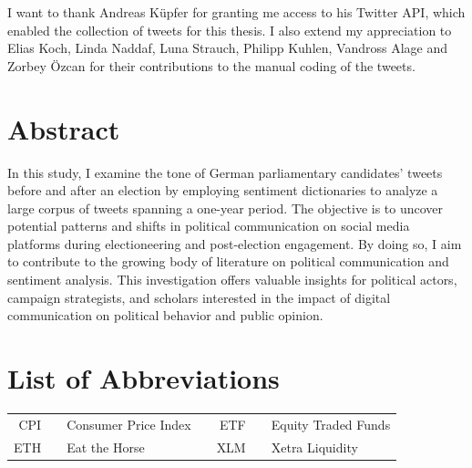 \documentclass[a4paper,11pt]{article}
\begin{document}
I want to thank Andreas Küpfer for granting me access to his Twitter API,
which enabled the collection of tweets for this thesis. I also extend my
appreciation to Elias Koch, Linda Naddaf, Luna Strauch, Philipp Kuhlen, Vandross
Alage and Zorbey Özcan for their contributions to the manual coding of the tweets.
\pagestyle{plain}
\setcounter{page}{1}    %

\newpage
\hypertarget{abstract}{%
\section*{Abstract}\label{abstract}}

In this study, I examine the tone of German parliamentary candidates' tweets before and after an election by employing sentiment dictionaries to analyze a large corpus of tweets spanning a one-year period. The objective is to uncover potential patterns and shifts in political communication on social media platforms during electioneering and post-election engagement. By doing so, I aim to contribute to the growing body of literature on political communication and sentiment analysis. This investigation offers valuable insights for political actors, campaign strategists, and scholars interested in the impact of digital communication on political behavior and public opinion.

\newpage
\tableofcontents
\clearpage

\newpage
\hypertarget{list-of-abbreviations}{%
\section*{List of Abbreviations}\label{list-of-abbreviations}}
\begin{tabular}{rp{0.2cm}lp{1cm}rp{0.2cm}l}
    CPI     & &  Consumer Price Index   & & ETF     & &  Equity Traded Funds  \\
    ETH     & &  Eat the Horse          & & XLM     & &  Xetra Liquidity
\end{tabular}
\newpage
\listoffigures
{}
\end{document}
